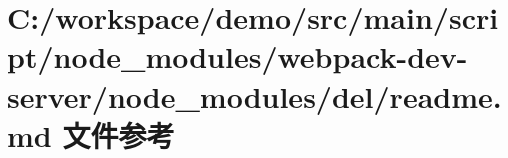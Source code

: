 \hypertarget{node__modules_2webpack-dev-server_2node__modules_2del_2_r_e_a_d_m_e_8md}{}\section{C\+:/workspace/demo/src/main/script/node\+\_\+modules/webpack-\/dev-\/server/node\+\_\+modules/del/readme.md 文件参考}
\label{node__modules_2webpack-dev-server_2node__modules_2del_2_r_e_a_d_m_e_8md}
